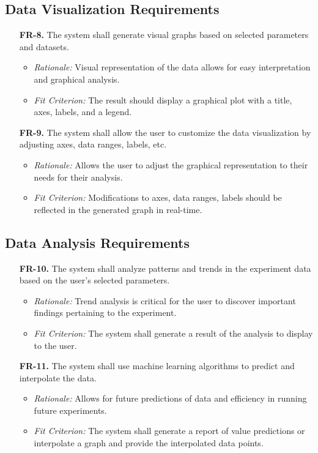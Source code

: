 \documentclass[12pt]{article}
\begin{document}
\subsection{Data Visualization Requirements}
\begin{enumerate}
  \item[\textbf{FR-8.}] The system shall generate visual graphs based on selected parameters and datasets.
  \begin{itemize}
    \item \textit{Rationale:} Visual representation of the data allows for easy interpretation and graphical analysis.
    \item \textit{Fit Criterion:} The result should display a graphical plot with a title, axes, labels, and a legend.
  \end{itemize}
  \item[\textbf{FR-9.}] The system shall allow the user to customize the data visualization by adjusting axes, data ranges, labels, etc.
  \begin{itemize}
    \item \textit{Rationale:} Allows the user to adjust the graphical representation to their needs for their analysis.
    \item \textit{Fit Criterion:} Modifications to axes, data ranges, labels should be reflected in the generated graph in real-time.
  \end{itemize}
\end{enumerate}

\subsection{Data Analysis Requirements}
\begin{enumerate}
    \item[\textbf{FR-10.}] The system shall analyze patterns and trends in the experiment data based on the user’s selected parameters.
    \begin{itemize}
      \item \textit{Rationale:} Trend analysis is critical for the user to discover important findings pertaining to the experiment.
      \item \textit{Fit Criterion:} The system shall generate a result of the analysis to display to the user.
    \end{itemize}
    \item[\textbf{FR-11.}] The system shall use machine learning algorithms to predict and interpolate the data.
    \begin{itemize}
      \item \textit{Rationale:} Allows for future predictions of data and efficiency in running future experiments.
      \item \textit{Fit Criterion:} The system shall generate a report of value predictions or interpolate a graph and provide the interpolated data points.
    \end{itemize}
\end{enumerate}
\end{document}
